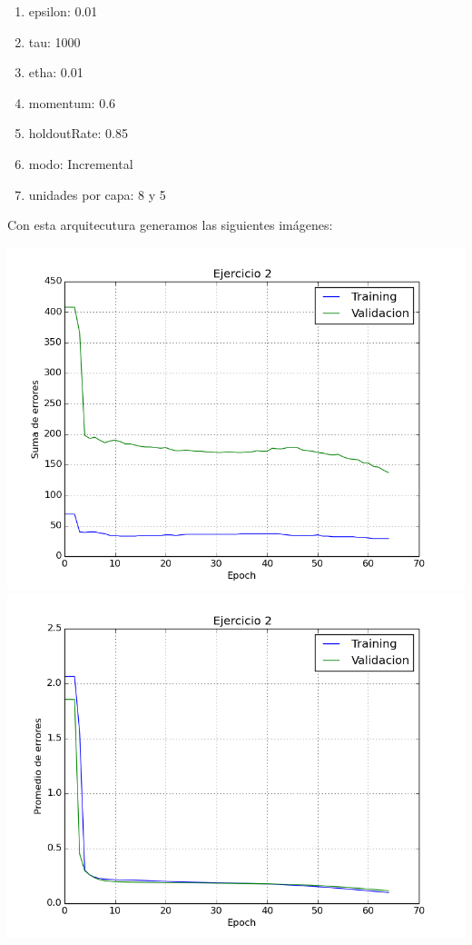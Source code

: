 \begin{enumerate}
\item epsilon: 0.01
\item tau: 1000
\item etha: 0.01
\item momentum: 0.6
\item holdoutRate: 0.85
\item modo: Incremental
\item unidades por capa: 8 y 5
\end{enumerate}

\newpage

Con esta arquitecutura generamos las siguientes imágenes:

\includegraphics[scale=0.4]{img/asum}
\includegraphics[scale=0.4]{img/bmean}


